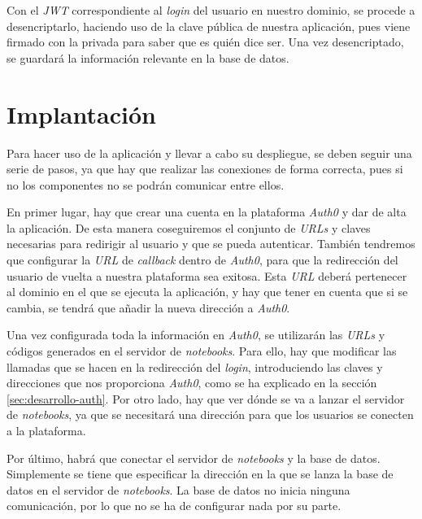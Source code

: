 \documentclass[11pt,spanish,listoffigures]{tfgetsinf}
\begin{document}
Con el \textit{JWT} correspondiente al \textit{login} del usuario en nuestro dominio, se procede a desencriptarlo, haciendo uso de la clave pública de nuestra aplicación, pues viene firmado con la privada para saber que es quién dice ser. Una vez desencriptado, se guardará la información relevante en la base de datos.





\chapter{Implantación}
\label{ch:implantacion}

Para hacer uso de la aplicación y llevar a cabo su despliegue, se deben seguir una serie de pasos, ya que hay que realizar las conexiones de forma correcta, pues si no los componentes no se podrán comunicar entre ellos.

En primer lugar, hay que crear una cuenta en la plataforma \textit{Auth0} y dar de alta la aplicación. De esta manera coseguiremos el conjunto de \textit{URLs} y claves necesarias para redirigir al usuario y que se pueda autenticar. También tendremos que configurar la \textit{URL} de \textit{callback} dentro de \textit{Auth0}, para que la redirección  del usuario de vuelta a nuestra plataforma sea exitosa. Esta \textit{URL} deberá pertenecer al dominio en el que se ejecuta la aplicación, y hay que tener en cuenta que si se cambia, se tendrá que añadir la nueva dirección a \textit{Auth0}.

Una vez configurada toda la información en \textit{Auth0}, se utilizarán las \textit{URLs} y códigos generados en el servidor de \textit{notebooks}. Para ello, hay que modificar las llamadas que se hacen en la redirección del \textit{login}, introduciendo las claves y direcciones que nos proporciona \textit{Auth0}, como se ha explicado en la sección \ref{sec:desarrollo-auth}. Por otro lado, hay que ver dónde se va a lanzar el servidor de \textit{notebooks}, ya que se necesitará una dirección para que los usuarios se conecten a la plataforma.

Por último, habrá que conectar el servidor de \textit{notebooks} y la base de datos. Simplemente se tiene que especificar la dirección en la que se lanza la base de datos en el servidor de \textit{notebooks}. La base de datos no inicia ninguna comunicación, por lo que no se ha de configurar nada por su parte. 
\end{document}
